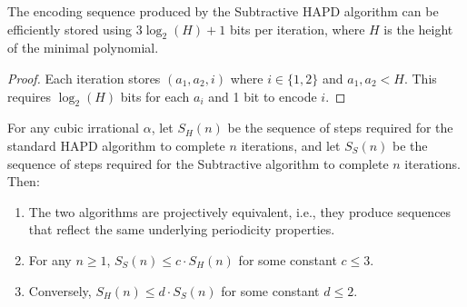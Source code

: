 \begin{proposition}\label{prop:storage_efficiency}
The encoding sequence produced by the Subtractive HAPD algorithm can be efficiently stored using $3\log_2(H) + 1$ bits per iteration, where $H$ is the height of the minimal polynomial.
\end{proposition}

\begin{proof}
Each iteration stores $(a_1, a_2, i)$ where $i \in \{1,2\}$ and $a_1, a_2 < H$. This requires $\log_2(H)$ bits for each $a_i$ and 1 bit to encode $i$.
\end{proof}

\begin{lemma}\label{lem:hapd_subtractive}
For any cubic irrational $\alpha$, let $S_H(n)$ be the sequence of steps required for the standard HAPD algorithm to complete $n$ iterations, and let $S_S(n)$ be the sequence of steps required for the Subtractive algorithm to complete $n$ iterations. Then:

\begin{enumerate}
\item The two algorithms are projectively equivalent, i.e., they produce sequences that reflect the same underlying periodicity properties.
\item For any $n \geq 1$, $S_S(n) \leq c \cdot S_H(n)$ for some constant $c \leq 3$.
\item Conversely, $S_H(n) \leq d \cdot S_S(n)$ for some constant $d \leq 2$.
\end{enumerate}
\end{lemma}

